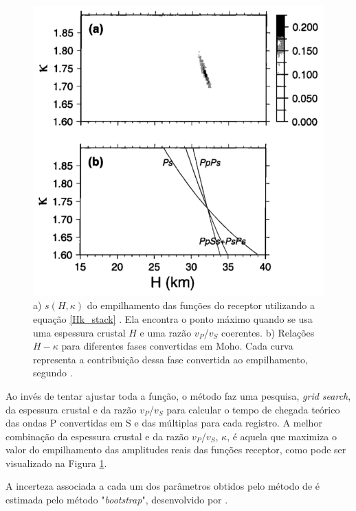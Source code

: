\begin{figure}[!ht]
\centering
\includegraphics[scale=0.5]{Figs/grid_search.png}
\caption[a) $s(H,\kappa)$ do empilhamento das funções do receptor utilizando a equação \ref{Hk_stack}.b) Relações $H-\kappa$ para diferentes fases convertidas em Moho.]{a) $s(H,\kappa)$ do empilhamento das funções do receptor utilizando a equação \ref{Hk_stack} . Ela encontra o ponto máximo quando se usa uma espessura crustal $H$ e uma razão $v_{P}$/$v_{S}$ coerentes. b) Relações $H-\kappa$ para diferentes fases convertidas em Moho. Cada curva representa a contribuição dessa fase convertida ao empilhamento, segundo \cite{Zhu_Kanamori_2000}.}
\label{grid_search}
\end{figure}

Ao invés de tentar ajustar toda a função, o método faz uma pesquisa, \textit{grid search}, da espessura crustal e da razão $v_{P}$/$v_{S}$ para calcular o tempo de chegada teórico das ondas P convertidas em S e das múltiplas para cada registro. A melhor combinação da espessura crustal e da razão $v_{P}$/$v_{S}$, $\kappa$, é aquela que maximiza o valor do empilhamento das amplitudes reais das funções receptor, como pode ser visualizado na Figura \ref{grid_search}.

A incerteza associada a cada um dos parâmetros obtidos pelo método de \cite{Zhu_Kanamori_2000} é estimada pelo método "\textit{bootstrap}", desenvolvido por \cite{efron_statistical_1991}.

